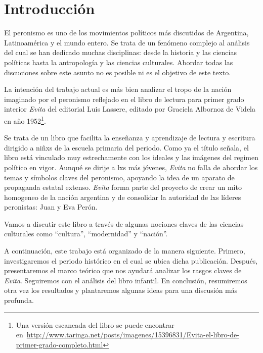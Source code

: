 \documentclass[
10pt, %
a4paper, %
oneside, %
headinclude,footinclude, %
]{scrartcl}
\begin{document}

\section{Introducción}
El peronismo es uno de los movimientos políticos más discutidos de Argentina, Latinoamérica y el mundo entero.
Se trata de un fenómeno complejo al análisis del cual se han dedicado muchas disciplinas: desde la historia y las ciencias políticas hasta la antropología y las ciencias culturales.
Abordar todas las discuciones sobre este asunto no es posible ni es el objetivo de este texto.

La intención del trabajo actual es más bien analizar el tropo de la nación imaginado por el peronismo reflejado en el libro de lectura para primer grado interior \textit{Evita} del editorial Luis Lassere, editado por Graciela Albornoz de Videla en año 1952\footnote{Una versión escaneada del libro se puede encontrar en~\url{http://www.taringa.net/posts/imagenes/15396831/Evita-el-libro-de-primer-grado-completo.html}}.

Se trata de un libro que facilita la enseñanza y aprendizaje de lectura y escritura dirigido a niñxs de la escuela primaria del periodo.
Como ya el título señala, el libro está vinculado muy estrechamente con los ideales y las imágenes del regimen político en vigor.
Aunqué se dirije a lxs más jóvenes, \textit{Evita} no falla de abordar los temas y símbolos claves del peronismo, apoyando la idea de un aparato de propaganda estatal extenso.
\textit{Evita} forma parte del proyecto de crear un mito homogeneo de la nación argentina
y de consolidar la autoridad de lxs líderes peronistas: Juan y Eva Perón.

Vamos a discutir este libro a través de algunas nociones claves de las ciencias culturales como ``cultura'', ``modernidad'' y ``nación''.

A continuación, este trabajo está organizado de la manera siguiente.
Primero, investigaremos el periodo histórico en el cual se ubica dicha publicación.
Después, presentaremos el marco teórico que nos ayudará analizar los rasgos claves de \textit{Evita}.
Seguiremos con el análisis del libro infantil.
En conclusión, resumiremos otra vez los resultados y plantaremos algunas ideas para una discusión más profunda.
\end{document}
